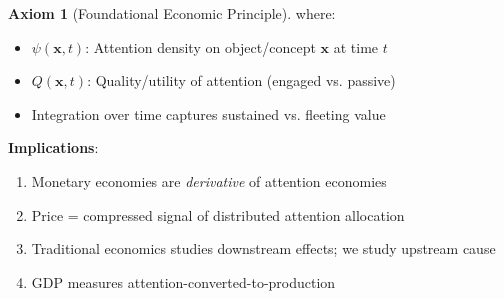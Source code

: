 \documentclass[11pt,a4paper]{article}
\theoremstyle{definition}
\newtheorem{axiom}{Axiom}[section]
\theoremstyle{remark}
\begin{document}
\begin{small}
\begin{axiom}[Foundational Economic Principle]
where:
\begin{itemize}
    \item \(\psi(\mathbf{x}, t)\): Attention density on object/concept \(\mathbf{x}\) at time \(t\)
    \item \(Q(\mathbf{x}, t)\): Quality/utility of attention (engaged vs. passive)
    \item Integration over time captures sustained vs. fleeting value
\end{itemize}

\textbf{Implications}:
\begin{enumerate}
\item Monetary economies are \textit{derivative} of attention economies
\item Price = compressed signal of distributed attention allocation
\item Traditional economics studies downstream effects; we study upstream cause
\item GDP measures attention-converted-to-production
\end{enumerate}
\end{axiom}


\end{small}
\end{document}
